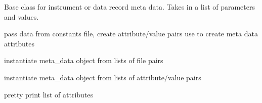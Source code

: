 \documentclass[letterpaper,10pt,english]{sphinxmanual}
\begin{document}
\begin{fulllineitems}
\label{\detokenize{code:ATom.atom_functions.meta_data}}
Base class for instrument or data record meta data.
Takes in a list of parameters and values.

\begin{fulllineitems}
\label{\detokenize{code:ATom.atom_functions.meta_data.from_data}}
pass data from constants file,
create attribute/value pairs
use to create meta data attributes

\end{fulllineitems}


\begin{fulllineitems}
\label{\detokenize{code:ATom.atom_functions.meta_data.from_file}}
instantiate meta\_data object from lists of file pairs

\end{fulllineitems}


\begin{fulllineitems}
\label{\detokenize{code:ATom.atom_functions.meta_data.from_lists}}
instantiate meta\_data object from lists of attribute/value pairs

\end{fulllineitems}


\begin{fulllineitems}
\label{\detokenize{code:ATom.atom_functions.meta_data.to_list}}
pretty print list of attributes

\end{fulllineitems}


\end{fulllineitems}
\end{document}
